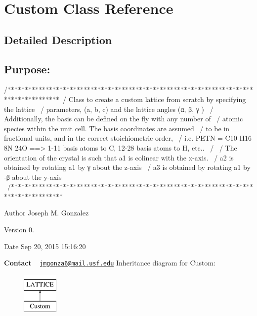 \hypertarget{class_custom}{}\section{Custom Class Reference}
\label{class_custom}


\subsection{Detailed Description}
\subsection*{{\bfseries Purpose\+:} }

\begin{DoxyVerb}/***************************************************************************************\
/  Class to create a custom lattice from scratch by specifying the lattice              \
/  parameters, (a, b, c) and the lattice angles (α, β, γ )                              \
/  Additionally, the basis can be defined on the fly with any number of                 \
/  atomic species within the unit cell.  The basis coordinates are assumed              \
/  to be in fractional units, and in the correct stoichiometric order,                  \
/  i.e. PETN = C10 H16 8N 24O ==> 1-11 basis atoms to C, 12-28 basis atoms to H, etc..  \
/                                                                                       \ 
/  The orientation of the crystal is such that a1 is colinear with the x-axis.          \
/  a2 is obtained by rotating a1 by γ about the z-axis                                  \
/  a3 is obtained by rotating a1 by -β about the y-axis                                 \
/***************************************************************************************\
\end{DoxyVerb}


\begin{DoxyAuthor}{Author}
Joseph M. Gonzalez
\end{DoxyAuthor}
\begin{DoxyVersion}{Version}
0.\+1
\end{DoxyVersion}
\begin{DoxyDate}{Date}
Sep 20, 2015 15\+:16\+:20
\end{DoxyDate}
{\bfseries Contact} ~\newline
 \href{mailto:jmgonza6@mail.usf.edu}{\tt jmgonza6@mail.\+usf.\+edu} Inheritance diagram for Custom\+:\begin{figure}[H]
\begin{center}
\leavevmode
\includegraphics[height=2.000000cm]{class_custom}
\end{center}
\end{figure}
